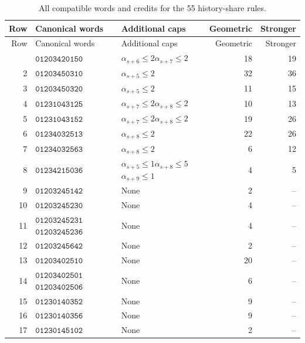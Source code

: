 \documentclass[11pt,a4paper]{article}
\theoremstyle{definition}
\theoremstyle{remark}
\begin{document}
\begingroup\small
\begin{longtable}{r p{} p{} r r}
\caption{All compatible words and credits for the 55 history-share rules.}\label{tab:history-share-catalogue}\\
\toprule
Row & Canonical words & Additional caps & Geometric & Stronger\\\midrule
\endfirsthead
\toprule
Row & Canonical words & Additional caps & Geometric & Stronger\\\midrule
\endhead
\bottomrule\endfoot
1 & \(\mathtt{01203420150}\) & \(\alpha_{s+6}\le2\)\newline \(\alpha_{s+7}\le2\) & 18 & 19\\
2 & \(\mathtt{01203450310}\) & \(\alpha_{s+5}\le2\) & 32 & 36\\
3 & \(\mathtt{01203450320}\) & \(\alpha_{s+5}\le2\) & 11 & 15\\
4 & \(\mathtt{01231043125}\) & \(\alpha_{s+7}\le2\)\newline \(\alpha_{s+8}\le2\) & 10 & 13\\
5 & \(\mathtt{01231043152}\) & \(\alpha_{s+7}\le2\)\newline \(\alpha_{s+8}\le2\) & 19 & 26\\
6 & \(\mathtt{01234032513}\) & \(\alpha_{s+8}\le2\) & 22 & 26\\
7 & \(\mathtt{01234032563}\) & \(\alpha_{s+8}\le2\) & 6 & 12\\
8 & \(\mathtt{01234215036}\) & \(\alpha_{s+5}\le1\)\newline \(\alpha_{s+8}\le5\)\newline \(\alpha_{s+9}\le1\) & 4 & 5\\
9 & \(\mathtt{01203245142}\) & None & 2 & --\\
10 & \(\mathtt{01203245230}\) & None & 4 & --\\
11 & \(\mathtt{01203245231}\)\newline \(\mathtt{01203245236}\) & None & 4 & --\\
12 & \(\mathtt{01203245642}\) & None & 2 & --\\
13 & \(\mathtt{01203402510}\) & None & 20 & --\\
14 & \(\mathtt{01203402501}\)\newline \(\mathtt{01203402506}\) & None & 6 & --\\
15 & \(\mathtt{01230140352}\) & None & 9 & --\\
16 & \(\mathtt{01230140356}\) & None & 9 & --\\
17 & \(\mathtt{01230145102}\) & None & 2 & --\\

\end{longtable}
\end{document}
